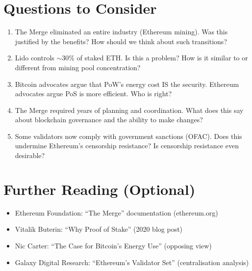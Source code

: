 \documentclass[11pt]{article}
\begin{document}
\section*{Questions to Consider}

\begin{enumerate}[leftmargin=*]
\item The Merge eliminated an entire industry (Ethereum mining). Was this justified by the benefits? How should we think about such transitions?

\item Lido controls $\sim$30\% of staked ETH. Is this a problem? How is it similar to or different from mining pool concentration?

\item Bitcoin advocates argue that PoW's energy cost IS the security. Ethereum advocates argue PoS is more efficient. Who is right?

\item The Merge required years of planning and coordination. What does this say about blockchain governance and the ability to make changes?

\item Some validators now comply with government sanctions (OFAC). Does this undermine Ethereum's censorship resistance? Is censorship resistance even desirable?
\end{enumerate}

\section*{Further Reading (Optional)}

\begin{itemize}[leftmargin=*]
\item Ethereum Foundation: ``The Merge'' documentation (ethereum.org)
\item Vitalik Buterin: ``Why Proof of Stake'' (2020 blog post)
\item Nic Carter: ``The Case for Bitcoin's Energy Use'' (opposing view)
\item Galaxy Digital Research: ``Ethereum's Validator Set'' (centralisation analysis)
\end{itemize}

\newpage

\end{document}
